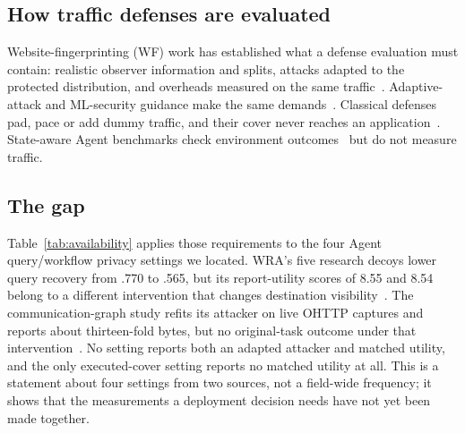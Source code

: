 \subsection{How traffic defenses are evaluated}
Website-fingerprinting (WF) work has established what a defense evaluation must contain: realistic observer information and splits, attacks adapted to the protected distribution, and overheads measured on the same traffic~\cite{juarez2014critical,mathews2023critical,dyer2012peekaboo}. Adaptive-attack and ML-security guidance make the same demands~\cite{tramer2020adaptive,arp2022dos}. Classical defenses pad, pace or add dummy traffic, and their cover never reaches an application~\cite{wang2017walkietalkie,gong2020front,juarez2016wtfpad,apthorpe2019stp}. State-aware Agent benchmarks check environment outcomes~\cite{yao2024taubench,debenedetti2024agentdojo} but do not measure traffic.

\subsection{The gap}\label{sec:gap}
Table~\ref{tab:availability} applies those requirements to the four Agent query/workflow privacy settings we located. WRA's five research decoys lower query recovery from .770 to .565, but its report-utility scores of 8.55 and 8.54 belong to a different intervention that changes destination visibility~\cite{jeong2026wra}. The communication-graph study refits its attacker on live OHTTP captures and reports about thirteen-fold bytes, but no original-task outcome under that intervention~\cite{dangol2026workflow}. No setting reports both an adapted attacker and matched utility, and the only executed-cover setting reports no matched utility at all. This is a statement about four settings from two sources, not a field-wide frequency; it shows that the measurements a deployment decision needs have not yet been made together.


